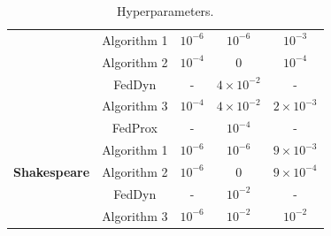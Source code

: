 \documentclass{article} %
\begin{document}
\begin{table}[ht!]
{\begin{tabular}{|c|cccc|}
                                      & Algorithm 1 & $10^{-6}$ & $10^{-6}$         & $10^{-3}$         \\
                                      & Algorithm 2 & $10^{-4}$ & 0                 & $10^{-4}$         \\
                                      & FedDyn      & -         & $4\times 10^{-2}$ & -                 \\
                                      & Algorithm 3 & $10^{-4}$ & $4\times 10^{-2}$ & $2\times 10^{-3}$ \\ \hline
\multirow{5}{*}{\textbf{Shakespeare}} & FedProx     & -         & $10^{-4}$         & -                 \\
                                      & Algorithm 1 & $10^{-6}$ & $10^{-6}$         & $9\times 10^{-3}$ \\
                                      & Algorithm 2 & $10^{-6}$ & 0                 & $9\times 10^{-4}$ \\
                                      & FedDyn      & -         & $10^{-2}$         & -                 \\
                                      & Algorithm 3 & $10^{-6}$ & $10^{-2}$         & $10^{-2}$         \\ \hline
\end{tabular}%
}
\caption{Hyperparameters.}
\label{tab:hyperparameter}
\end{table}

\end{document}
